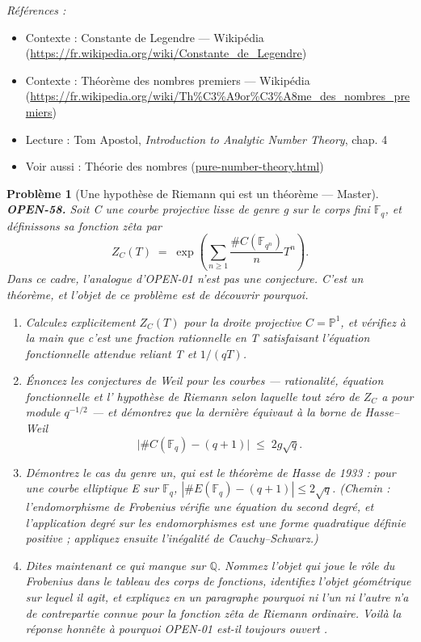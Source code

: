 \documentclass[11pt]{article}
\newtheorem{problem}{Problème}
\newenvironment{refs}{\par\small\noindent\emph{Références :}\begin{itemize}\setlength\itemsep{0pt}}{\end{itemize}\normalsize}
\begin{document}
\begin{refs}
\item Contexte : Constante de Legendre --- Wikipédia (\url{https://fr.wikipedia.org/wiki/Constante_de_Legendre})
\item Contexte : Théorème des nombres premiers --- Wikipédia (\url{https://fr.wikipedia.org/wiki/Th%C3%A9or%C3%A8me_des_nombres_premiers})
\item Lecture : Tom Apostol, \textit{Introduction to Analytic Number Theory}, chap. 4
\item Voir aussi : Théorie des nombres (\url{pure-number-theory.html})
\end{refs}

\bigskip

\begin{problem}[{Une hypothèse de Riemann qui est un théorème --- Master}]
\textbf{OPEN-58.} Soit C une courbe projective lisse de genre g sur le corps fini
$ \mathbb{F}_q $, et définissons sa fonction zêta par
\[ Z_C(T) \;=\; \exp\left( \sum_{n \ge 1} \frac{\# C(\mathbb{F}_{q^n})}{n} T^n \right). \]
Dans ce cadre, l'analogue d'OPEN-01 n'est pas une conjecture. C'est un théorème, et
l'objet de ce problème est de découvrir pourquoi.
\begin{enumerate}
\item[(a)] Calculez explicitement $ Z_C(T) $ pour la droite projective
$ C = \mathbb{P}^1 $, et vérifiez à la main que c'est une fraction rationnelle en T
satisfaisant l'équation fonctionnelle attendue reliant T et $ 1/(qT) $.
\item[(b)] Énoncez les conjectures de Weil pour les courbes --- rationalité, équation fonctionnelle
et l'\og{} hypothèse de Riemann \fg{} selon laquelle tout zéro de $ Z_C $ a pour module
$ q^{-1/2} $ --- et démontrez que la dernière équivaut à la borne de Hasse--Weil
\[ \bigl| \# C(\mathbb{F}_q) - (q+1) \bigr| \;\le\; 2g\sqrt{q}. \]
\item[(c)] Démontrez le cas du genre un, qui est le théorème de Hasse de 1933 : pour une courbe
elliptique E sur $ \mathbb{F}_q $,
$ |\# E(\mathbb{F}_q) - (q+1)| \le 2\sqrt{q} $. (Chemin : l'endomorphisme de Frobenius
vérifie une équation du second degré, et l'application degré sur les endomorphismes est
une forme quadratique définie positive ; appliquez ensuite l'inégalité de
Cauchy--Schwarz.)
\item[(d)] Dites maintenant ce qui manque sur $\mathbb{Q}$. Nommez l'objet qui joue le rôle du Frobenius
dans le tableau des corps de fonctions, identifiez l'objet géométrique sur lequel il agit,
et expliquez en un paragraphe pourquoi ni l'un ni l'autre n'a de contrepartie connue pour
la fonction zêta de Riemann ordinaire. Voilà la réponse honnête à \og{} pourquoi OPEN-01
est-il toujours ouvert \fg{}.
\end{enumerate}

\end{problem}
\end{document}
